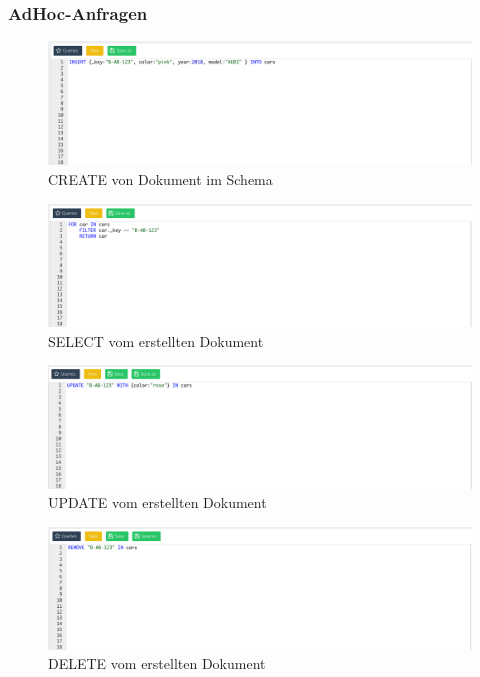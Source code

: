 \subsubsection{AdHoc-Anfragen}
\begin{figure}[htbp] 
  	\centering
     \includegraphics[width=1\textwidth]{./images/create.png}
 	\caption{CREATE von Dokument im Schema}
  \label{fig:DataSchema}
\end{figure}
\begin{figure}[htbp] 
  	\centering
     \includegraphics[width=1\textwidth]{./images/select.png}
 	\caption{SELECT vom erstellten Dokument}
  \label{fig:DataSchema}
\end{figure}
\begin{figure}[htbp] 
  	\centering
     \includegraphics[width=1\textwidth]{./images/update.png}
 	\caption{UPDATE vom erstellten Dokument}
  \label{fig:DataSchema}
\end{figure}
\begin{figure}[htbp] 
  	\centering
     \includegraphics[width=1\textwidth]{./images/delete.png}
 	\caption{DELETE vom erstellten Dokument}
  \label{fig:DataSchema}
\end{figure}